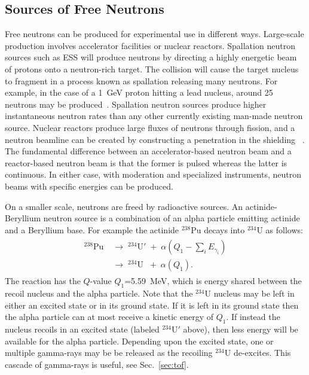 \documentclass[main.tex]{subfiles}
\begin{document}
\subsection{Sources of Free Neutrons} \label{sec:freeNeutrons}
Free neutrons can be produced for experimental use in different ways. Large-scale production involves accelerator facilities or nuclear reactors. Spallation neutron sources such as ESS will produce neutrons by directing a highly energetic beam of protons onto a neutron-rich target. The collision will cause the target nucleus to fragment in a process known as spallation releasing many neutrons. 
For example, in the case of a \SI{1}{\GeV} proton hitting a lead nucleus, around 25 neutrons may be produced~\cite{Tavernier}. Spallation neutron sources produce higher instantaneous neutron rates than any other currently existing man-made neutron source.
Nuclear reactors produce large fluxes of neutrons through fission, and a neutron beamline can be created by constructing a penetration in the shielding ~\cite{Krane}. The fundamental difference between an accelerator-based neutron beam and a reactor-based neutron beam is that the former is pulsed whereas the latter is continuous. In either case, with moderation and specialized instruments, neutron beams with specific energies can be produced.

On a smaller scale, neutrons are freed by radioactive sources. An actinide-Beryllium neutron source is a combination of an alpha particle emitting actinide and a Beryllium base. For example the actinide $^{238}$Pu decays into $^{234}$U as follows:
\begin{align}
	\begin{split}	
		^\textrm{238}\textrm{Pu}\;&\rightarrow\;^{\textrm{234}}\textrm{U}'\;+\;\alpha\left(Q_1-\textstyle\sum_i E_{\gamma_i}\right)\\
		&\rightarrow\;^{\textrm{234}}\textrm{U}\;\;+\;\alpha(Q_1).
	\label{eq:actinide}
	\end{split}
\end{align}
The reaction has the $Q$-value $Q_1$=\SI{5.59}{\MeV}, which is energy shared between the recoil nucleus and the alpha particle. Note that the $^\textrm{234}$U nucleus may be left in either an excited state or in its ground state. If it is left in its ground state then the alpha particle can at most receive a kinetic energy of $Q_1$. If instead the nucleus recoils in an excited state (labeled $^\textrm{234}$U$'$ above), then less energy will be available for the alpha particle.
Depending upon the excited state, one or multiple gamma-rays may be be released as the recoiling $^\textrm{234}$U de-excites. This cascade of gamma-rays is useful, see Sec.~\ref{sec:tof}.
\end{document}
